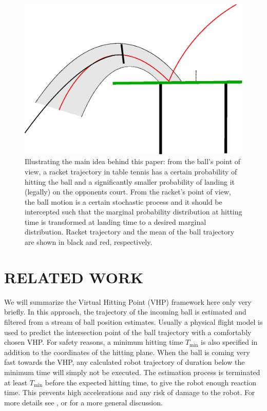 \documentclass[letterpaper, 10 pt, conference]{ieeeconf}
\begin{document}
\begin{figure}[t!]
\centering
\includegraphics[scale=0.4]{drawing.eps}			
\caption{Illustrating the main idea behind this paper: from the ball's point of view, a racket trajectory in table tennis has a certain probability of hitting the ball and a significantly smaller probability of landing it (legally) on the opponents court. From the racket's point of view, the ball motion is a certain stochastic process and it should be intercepted such that the marginal probability distribution at hitting time is transformed at landing time to a desired marginal distribution. Racket trajectory and the mean of the ball trajectory are shown in black and red, respectively. }
\label{mainIdea}
\end{figure}

\section{RELATED WORK}\label{relatedWork}

We will summarize the Virtual Hitting Point (VHP) framework here only very briefly. In this approach, the trajectory of the incoming ball is estimated and filtered from a stream of ball position estimates. Usually a physical flight model is used to predict the intersection point of the ball trajectory with a comfortably chosen VHP. For safety reasons, a minimum hitting time $T_{\textrm{min}}$ is also specified in addition to the coordinates of the hitting plane. When the ball is coming very fast towards the VHP, any calculated robot trajectory of duration below the minimum time will simply not be executed. The estimation process is terminated at least $T_{\textrm{min}}$ before the expected hitting time, to give the robot enough reaction time. This prevents high accelerations and any risk of damage to the robot. For more details see \cite{Muelling13}, or \cite{Matsushima05} for a more general discussion. 
\end{document}
